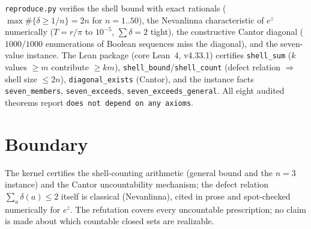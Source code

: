 \documentclass[11pt]{article}
\begin{document}
\texttt{reproduce.py} verifies the shell bound with exact rationals
($\max \#\{\delta \ge 1/n\} = 2n$ for $n = 1..50$), the Nevanlinna
characteristic of $e^z$ numerically ($T = r/\pi$ to $10^{-5}$,
$\sum \delta = 2$ tight), the constructive Cantor diagonal
($1000/1000$ enumerations of Boolean sequences miss the diagonal),
and the seven-value instance.  The Lean package (core Lean~4,
v4.33.1) certifies \texttt{shell\_sum} ($k$ values $\ge m$ contribute
$\ge k m$), \texttt{shell\_bound}/\texttt{shell\_count} (defect
relation $\Rightarrow$ shell size $\le 2n$), \texttt{diagonal\_exists}
(Cantor), and the instance facts \texttt{seven\_members},
\texttt{seven\_exceeds}, \texttt{seven\_exceeds\_general}.  All eight
audited theorems report \texttt{does not depend on any axioms}.

\section{Boundary}

The kernel certifies the shell-counting arithmetic (general bound and
the $n = 3$ instance) and the Cantor uncountability mechanism; the
defect relation $\sum_a \delta(a) \le 2$ itself is classical
(Nevanlinna), cited in prose and spot-checked numerically for $e^z$.
The refutation covers every uncountable prescription; no claim is
made about which countable closed sets are realizable.
\end{document}
